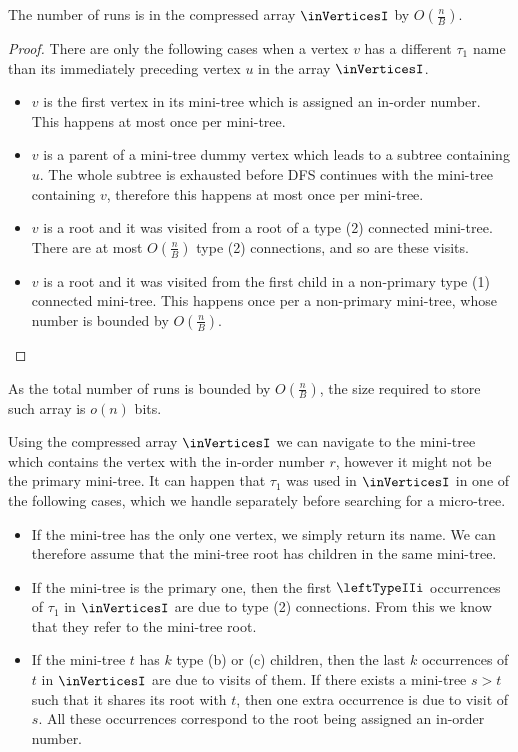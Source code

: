 \begin{lemma}
	The number of runs is in the compressed array $\inVerticesI$ by $O(\frac{n}{B})$.
\end{lemma}
\begin{proof}
	There are only the following cases when a vertex $v$ has a different $\tau_1$ name than its immediately preceding vertex $u$ in the array $\inVerticesI$.
	\begin{itemize}
		\item $v$ is the first vertex in its mini-tree which is assigned an in-order number.
		This happens at most once per mini-tree.

		\item $v$ is a parent of a mini-tree dummy vertex which leads to a subtree containing $u$.
		The whole subtree is exhausted before DFS continues with the mini-tree containing $v$, therefore this happens at most once per mini-tree.

		\item $v$ is a root and it was visited from a root of a type (2) connected mini-tree.
		There are at most $O(\frac{n}{B})$ type (2) connections, and so are these visits.
		
		\item $v$ is a root and it was visited from the first child in a non-primary type (1) connected mini-tree.
		This happens once per a non-primary mini-tree, whose number is bounded by $O(\frac{n}{B})$.
	\end{itemize}
\end{proof}

As the total number of runs is bounded by $O(\frac{n}{B})$, the size required to store such array is $o(n)$ bits.

Using the compressed array $\inVerticesI$ we can navigate to the mini-tree which contains the vertex with the in-order number $r$, however it might not be the primary mini-tree.
It can happen that $\tau_1$ was used in $\inVerticesI$ in one of the following cases, which we handle separately before searching for a micro-tree.
\begin{itemize}
	\item If the mini-tree has the only one vertex, we simply return its name.
	We can therefore assume that the mini-tree root has children in the same mini-tree.
	
	\item If the mini-tree is the primary one, then the first $\leftTypeIIi$ occurrences of $\tau_1$ in $\inVerticesI$ are due to type (2) connections.
	From this we know that they refer to the mini-tree root.

	\item If the mini-tree $t$ has $k$ type (b) or (c) children, then the last $k$ occurrences of $t$ in $\inVerticesI$ are due to visits of them.
	If there exists a mini-tree $s > t$ such that it shares its root with $t$, then one extra occurrence is due to visit of $s$.
	All these occurrences correspond to the root being assigned an in-order number.
\end{itemize}

